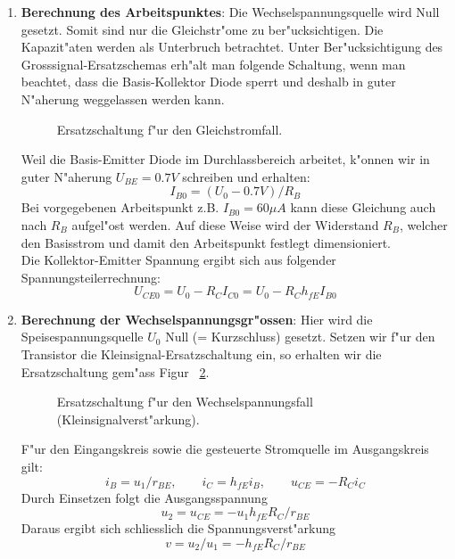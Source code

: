 \documentclass[german, 10pt, a4paper, headsepline]{scrreprt}
\theoremstyle{remark}
\begin{document}
\begin{enumerate}
	\item \textbf{Berechnung des Arbeitspunktes}: Die Wechselspannungsquelle wird Null ge\-setzt. Somit sind nur die Gleichstr"ome zu ber"ucksichtigen. Die Kapazit"aten werden als Unterbruch betrachtet. Unter Ber"ucksichtigung des Grosssignal-Ersatz\-schemas erh"alt man folgende Schaltung, wenn man beachtet, dass die Basis-Kollektor Diode sperrt und deshalb in guter N"aherung weg\-gelassen werden kann.
	\begin{figure}[hbt]
	 
	 \centerline{\box\graph}
	 \caption{Ersatzschaltung f"ur den Gleichstromfall.}
	 \label{ersatz_emitterschaltung}
	\end{figure}

	Weil die Basis-Emitter Diode im Durchlassbereich arbeitet, k"onnen wir in guter N"aherung $U_{BE} = 0.7V$ schreiben und erhalten:
	\begin{displaymath}
		I_{B0} = (U_0 - 0.7V) / R_B
	\end{displaymath}
	Bei vorgegebenen Arbeitspunkt z.B. $I_{B0} = 60 \mu A$ kann diese Gleichung auch nach $R_B$ aufgel"ost werden. Auf diese Weise wird der Widerstand $R_B$, welcher den Basisstrom und damit den Arbeitspunkt festlegt dimensioniert.\\
	
	Die Kollektor-Emitter Spannung ergibt sich aus folgender Spannungsteilerrechnung:
	\begin{displaymath}
		U_{CE0} = U_0 - R_C I_{C0} = U_0 - R_C h_{fE}I_{B0}
	\end{displaymath}
	\item \textbf{Berechnung der Wechselspannungsgr"ossen}: Hier wird die Speise\-spannungs\-quelle $U_0$ Null (= Kurzschluss) gesetzt. Setzen wir f"ur den Transistor die Klein\-signal-Ersatzschaltung ein, so erhalten wir die Ersatzschaltung gem"ass Figur ~\ref{ersatz2_emitterschaltung}.
	\begin{figure}[hbt]
	 
	 \centerline{\box\graph}
	 \caption{Ersatzschaltung f"ur den Wechselspannungsfall (Kleinsignalverst"arkung).}
	 \label{ersatz2_emitterschaltung}
	\end{figure}

	F"ur den Eingangskreis sowie die gesteuerte Stromquelle im Ausgangskreis gilt:
	\begin{displaymath}
		i_B = u_1 / r_{BE}, \qquad i_C = h_{fE} i_B, \qquad u_{CE} = -R_C i_C
	\end{displaymath}
	Durch Einsetzen folgt die Ausgangsspannung
	\begin{displaymath}
		u_2 = u_{CE} = - u_1 h_{fE} R_C / r_{BE}
	\end{displaymath}
	Daraus ergibt sich schliesslich die Spannungsverst"arkung
	\begin{displaymath}
		v = u_2 / u_1 = - h_{fE} R_C / r_{BE}
	\end{displaymath}

\end{enumerate}
\end{document}
